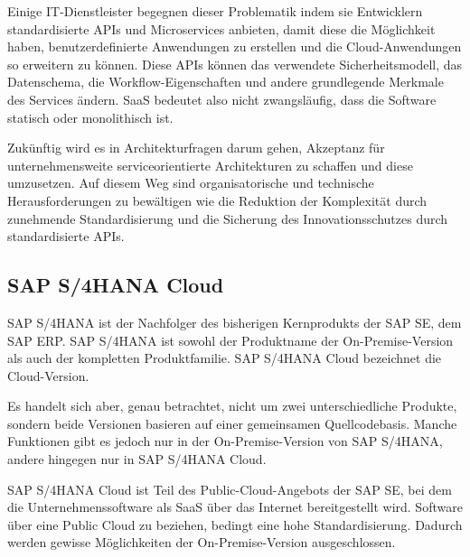Einige \ac{IT}-Dienstleister begegnen dieser Problematik indem sie Entwicklern standardisierte \acl{API}s und Microservices anbieten, damit diese die Möglichkeit haben, benutzerdefinierte Anwendungen zu erstellen und die Cloud-Anwendungen so erweitern zu können. Diese APIs können das verwendete Sicherheitsmodell, das Datenschema, die Workflow-Eigenschaften und andere grundlegende Merkmale des Services ändern. \ac{SaaS} bedeutet also nicht zwangsläufig, dass die Software statisch oder monolithisch ist.
\autocite{Sosinsky.2011}

Zukünftig wird es in Architekturfragen darum gehen, Akzeptanz für unternehmensweite serviceorientierte Architekturen zu schaffen und diese umzusetzen. Auf diesem Weg sind organisatorische und technische Herausforderungen zu bewältigen wie die Reduktion der Komplexität durch zunehmende Standardisierung und die Sicherung des Innovationsschutzes durch standardisierte \ac{API}s.
\autocite{Keuper.2010}

\subsection{SAP S/4HANA Cloud}
SAP S/4HANA ist der Nachfolger des bisherigen Kernprodukts der SAP SE, dem SAP \ac{ERP}. SAP S/4HANA ist sowohl der Produktname der On-Premise-Version als auch der kompletten Produktfamilie. SAP S/4HANA Cloud bezeichnet die Cloud-Version.
\autocite{Warnecke.2018}

Es handelt sich aber, genau betrachtet, nicht um zwei unterschiedliche Produkte, sondern beide Versionen basieren auf einer gemeinsamen Quellcodebasis. Manche Funktionen gibt es jedoch nur in der On-Premise-Version von SAP S/4HANA, andere hingegen nur in SAP S/4HANA Cloud.
\autocite[25]{Schneider.2018}

SAP S/4HANA Cloud ist Teil des Public-Cloud-Angebots der SAP SE, bei dem die Unternehmenssoftware als \ac{SaaS} über das Internet bereitgestellt wird. Software über eine Public Cloud zu beziehen, bedingt eine hohe Standardisierung. Dadurch werden gewisse Möglichkeiten der On-Premise-Version ausgeschlossen.
\autocite{Schneider.2018}

